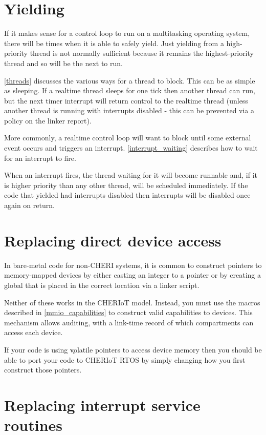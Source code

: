 \section{Yielding}

If it makes sense for a control loop to run on a multitasking operating system, there will be times when it is able to safely yield.
Just yielding from a high-priority thread is not normally sufficient because it remains the highest-priority thread and so will be the next to run.

\ref{threads} discusses the various ways for a thread to block.
This can be as simple as sleeping.
If a realtime thread sleeps for one tick then another thread can run, but the next timer interrupt will return control to the realtime thread (unless another thread is running with interrupts disabled - this can be prevented via a policy on the linker report).

More commonly, a realtime control loop will want to block until some external event occurs and triggers an interrupt.
\ref{interrupt_waiting} describes how to wait for an interrupt to fire.

When an interrupt fires, the thread waiting for it will become runnable and, if it is higher priority than any other thread, will be scheduled immediately.
If the code that yielded had interrupts disabled then interrupts will be disabled once again on return.

\section{Replacing direct device access}

In bare-metal code for non-CHERI systems, it is common to construct pointers to memory-mapped devices by either casting an integer to a pointer or by creating a global that is placed in the correct location via a linker script.

Neither of these works in the CHERIoT model.
Instead, you must use the macros described in \ref{mmio_capabilities} to construct valid capabilities to devices.
This mechanism allows auditing, with a link-time record of which compartments can access each device.

If your code is using \c{volatile} pointers to access device memory then you should be able to port your code to CHERIoT RTOS by simply changing how you first construct those pointers.

\section{Replacing interrupt service routines}


